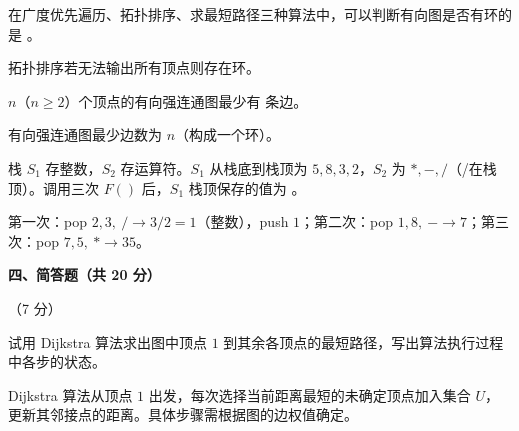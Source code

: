 \begin{question}
在广度优先遍历、拓扑排序、求最短路径三种算法中，可以判断有向图是否有环的是 \underline{\hspace{4em}}。
\begin{solution}
拓扑排序若无法输出所有顶点则存在环。
\end{solution}
\end{question}

\begin{question}
$n$（$n\ge2$）个顶点的有向强连通图最少有 \underline{\hspace{4em}} 条边。
\begin{solution}
有向强连通图最少边数为 $n$（构成一个环）。
\end{solution}
\end{question}

\begin{question}
栈 $S_1$ 存整数，$S_2$ 存运算符。$S_1$ 从栈底到栈顶为 $5,8,3,2$，$S_2$ 为 $*,-,/$（/在栈顶）。调用三次 $F()$ 后，$S_1$ 栈顶保存的值为 \underline{\hspace{4em}}。
\begin{solution}
第一次：pop $2,3,\ /\to 3/2=1$（整数），push $1$；第二次：pop $1,8,\ -\to 7$；第三次：pop $7,5,\ *\to 35$。
\end{solution}
\end{question}

\clearpage

\textbf{四、简答题（共 20 分）}

\begin{question}[Dijkstra 算法]（7 分）

试用 Dijkstra 算法求出图中顶点 $1$ 到其余各顶点的最短路径，写出算法执行过程中各步的状态。

\begin{solution}
Dijkstra 算法从顶点 $1$ 出发，每次选择当前距离最短的未确定顶点加入集合 $U$，更新其邻接点的距离。具体步骤需根据图的边权值确定。
\end{solution}
\end{question}

